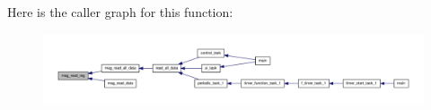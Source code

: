 Here is the caller graph for this function\-:
\nopagebreak
\begin{figure}[H]
\begin{center}
\leavevmode
\includegraphics[width=350pt]{group__mag_ga6830eaeae2298320e1e8c902e4edd709_icgraph}
\end{center}
\end{figure}


